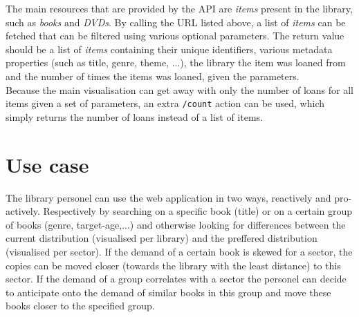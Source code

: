 The main resources that are provided by the API are \emph{items} present in the library, such as \emph{books} and \emph{DVDs}.
By calling the URL listed above, a list of \emph{items} can be fetched that can be filtered using various optional parameters.
The return value should be a list of \emph{items} containing their unique identifiers, various metadata properties (such as title, genre, theme, ...), the library the item was loaned from and the number of times the items was loaned, given the parameters.\\

Because the main visualisation can get away with only the number of loans for all items given a set of parameters, an extra \texttt{/count} action can be used, which simply returns the number of loans instead of a list of items.

\section{Use case}

The library personel can use the web application in two ways, reactively and pro-actively. Respectively by searching on a specific book (title) or on a certain group of books (genre, target-age,...) and otherwise looking for differences between the current distribution (visualised per library) and the preffered distribution (visualised per sector). If the demand of a certain book is skewed for a sector, the copies can be moved closer (towards the library with the least distance) to this sector. If the demand of a group correlates with a sector the personel can decide to anticipate onto the demand of similar books in this group and move these books closer to the specified group.
